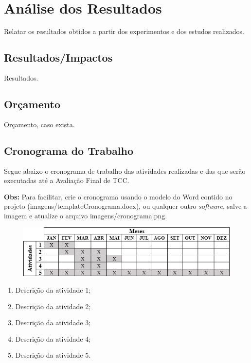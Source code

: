 \chapter{Análise dos Resultados}
\label{cap:04}

Relatar os resultados obtidos a partir dos experimentos e dos estudos realizados. 


\section{Resultados/Impactos}

Resultados.


\section{Orçamento}

Orçamento, caso exista.


\section{Cronograma do Trabalho}

Segue abaixo o cronograma de trabalho das atividades realizadas e das que serão executadas até a Avaliação Final de TCC.

\textbf{Obs:} Para facilitar, crie o cronograma usando o modelo do Word contido no projeto (imagens/templateCronograma.docx), ou qualquer outro \textit{software}, salve a imagem e atualize o arquivo imagens/cronograma.png.

\FloatBarrier
\begin{figure}[!htbp]
	\centering
	\includegraphics[scale=1]{imagens/cronograma}
\end{figure}
\FloatBarrier

\begin{enumerate}
	\item Descrição da atividade 1;
	\item Descrição da atividade 2;
	\item Descrição da atividade 3;
	\item Descrição da atividade 4;
	\item Descrição da atividade 5.
\end{enumerate}
